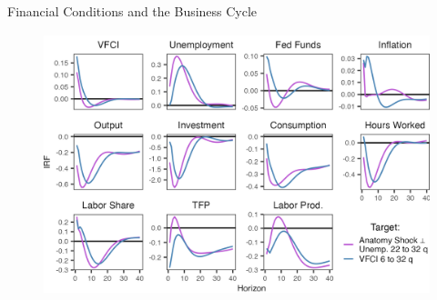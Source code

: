 \begin{frame}{Financial Conditions and the Business Cycle}

    \begin{figure}
        \includegraphics[height = 3in]{figs/fig5_irf_resid_vfci.png}
    \end{figure}

\end{frame}
